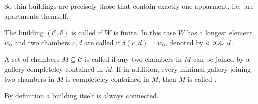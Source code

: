So thin buildings are precisely those that contain exactly one apparment, i.e.\ are apartments themself.

\begin{defi}
	The building $(\mathcal{C},\delta)$ is called  if $W$ is finite. In this case $W$ has a longest element $w_0$ and two chambers $c,d$ are called  if $\delta(c,d) = w_0$, denoted by $c \opp d$.
\end{defi}

\begin{defi}
	A set of chambers $M \subseteq \mathcal{C}$ is called  if any two chambers in $M$ can be joined by a gallery completeley contained in $M$. If in addition, every minimal gallery joining two chambers in $M$ is completeley contained in $M$, then $M$ is called .
\end{defi}

\begin{rema}
	By definition a building itself is always connected.
\end{rema}
